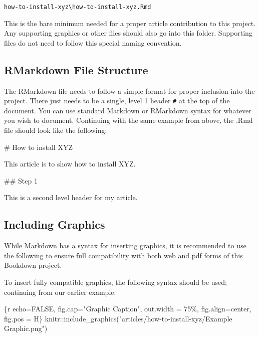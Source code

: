 \documentclass[
]{book}
\newenvironment{Shaded}{\begin{snugshade}}{\end{snugshade}}
\newcommand{\NormalTok}[1]{#1}
\begin{document}
\texttt{how-to-install-xyz\textbackslash{}how-to-install-xyz.Rmd}

This is the bare minimum needed for a proper article contribution to this project. Any supporting graphics or other files should also go into this folder. Supporting files do not need to follow this special naming convention.

\hypertarget{rmarkdown-file-structure}{%
\subsection{RMarkdown File Structure}\label{rmarkdown-file-structure}}

The RMarkdown file needs to follow a simple format for proper inclusion into the project. There just needs to be a single, level 1 header \texttt{\#} at the top of the document. You can use standard Markdown or RMarkdown syntax for whatever you wish to document. Continuing with the same example from above, the .Rmd file should look like the following:

\begin{Shaded}
\begin{Highlighting}[numbers=left,,]
\NormalTok{\# How to install XYZ}

\NormalTok{This article is to show how to install XYZ.}

\NormalTok{\#\# Step 1}

\NormalTok{This is a second level header for my article.}
\end{Highlighting}
\end{Shaded}

\hypertarget{including-graphics}{%
\subsection{Including Graphics}\label{including-graphics}}

While Markdown has a syntax for inserting graphics, it is recommended to use the following to ensure full compatibility with both web and pdf forms of this Bookdown project.

To insert fully compatible graphics, the following syntax should be used; continuing from our earlier example:

\begin{Shaded}
\begin{Highlighting}[]
\NormalTok{\textasciigrave{}\textasciigrave{}\textasciigrave{}\{r echo=FALSE, fig.cap="Graphic Caption", out.width = \textquotesingle{}75\%\textquotesingle{}, fig.align=\textquotesingle{}center\textquotesingle{}, fig.pos = \textquotesingle{}H\textquotesingle{}\}}
\NormalTok{knitr::include\_graphics("articles/how{-}to{-}install{-}xyz/Example Graphic.png")}
\NormalTok{\textasciigrave{}\textasciigrave{}\textasciigrave{}}
\end{Highlighting}
\end{Shaded}
\end{document}
